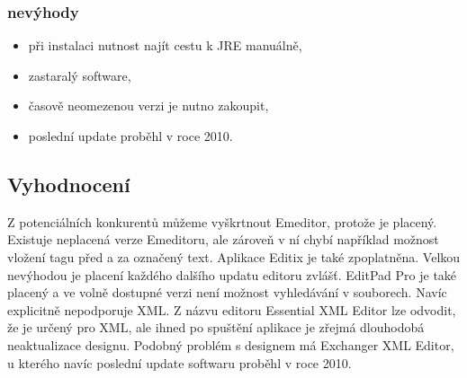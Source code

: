             \subsubsection{nevýhody}
                \begin{itemize}
                    \item při instalaci nutnost najít cestu k JRE manuálně,
                    \item zastaralý software,
                    \item časově neomezenou verzi je nutno zakoupit,
                    \item poslední update proběhl v roce 2010.
                \end{itemize}
        \subsection{Vyhodnocení}

             Z potenciálních konkurentů můžeme vyškrtnout Emeditor, protože je placený. Existuje neplacená verze Emeditoru, ale zároveň v ní chybí například možnost vložení tagu před a za označený text. Aplikace Editix je také zpoplatněna. Velkou nevýhodou je placení každého dalšího updatu editoru zvlášť. EditPad Pro je také placený a ve volně dostupné verzi není možnost vyhledávání v souborech. Navíc explicitně nepodporuje XML. Z názvu editoru Essential XML Editor lze odvodit, že je určený pro XML, ale ihned po spuštění aplikace je zřejmá dlouhodobá neaktualizace designu. Podobný problém s designem má Exchanger XML Editor, u kterého navíc poslední update softwaru proběhl v roce 2010.
        
        

            
